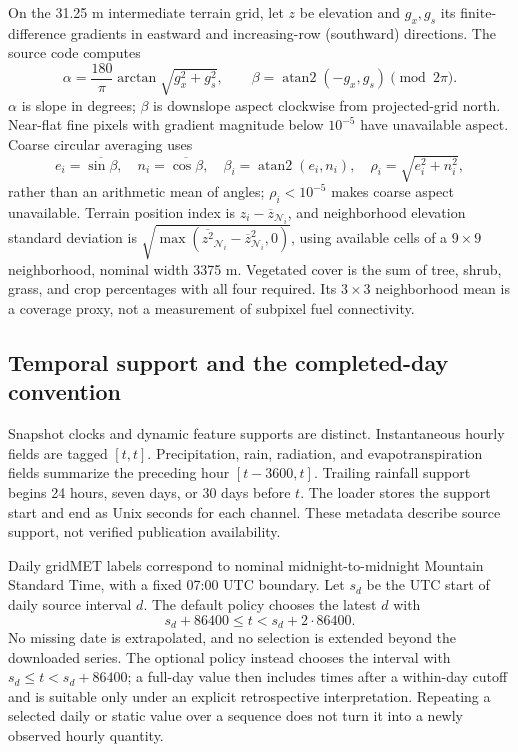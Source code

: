\documentclass[11pt,a4paper]{article}
\begin{document}
On the 31.25 m intermediate terrain grid, let $z$ be elevation and $g_x,g_s$
its finite-difference gradients in eastward and increasing-row (southward)
directions. The source code computes
\begin{equation}
\alpha=\frac{180}{\pi}\arctan\sqrt{g_x^2+g_s^2},\qquad
\beta=\operatorname{atan2}(-g_x,g_s)\pmod{2\pi}.
\end{equation}
$\alpha$ is slope in degrees; $\beta$ is downslope aspect clockwise from
projected-grid north. Near-flat fine pixels with gradient magnitude below
$10^{-5}$ have unavailable aspect. Coarse circular averaging uses
\begin{equation}
e_i=\overline{\sin\beta},\quad n_i=\overline{\cos\beta},\quad
\beta_i=\operatorname{atan2}(e_i,n_i),\quad
\rho_i=\sqrt{e_i^2+n_i^2},
\end{equation}
rather than an arithmetic mean of angles; $\rho_i<10^{-5}$ makes coarse
aspect unavailable. Terrain position index is $z_i-\overline z_{\mathcal N_i}$,
and neighborhood elevation standard deviation is
$\sqrt{\max(\overline{z^2}_{\mathcal N_i}-\overline z_{\mathcal N_i}^2,0)}$,
using available cells of a $9\times9$ neighborhood, nominal width 3375 m.
Vegetated cover is the sum of tree, shrub, grass, and crop percentages with
all four required. Its $3\times3$ neighborhood mean is a coverage proxy, not
a measurement of subpixel fuel connectivity.

\subsection{Temporal support and the completed-day convention}
\label{sec:timesupport}
Snapshot clocks and dynamic feature supports are distinct. Instantaneous
hourly fields are tagged $[t,t]$. Precipitation, rain, radiation, and
evapotranspiration fields summarize the preceding hour $[t-3600,t]$.
Trailing rainfall support begins 24 hours, seven days, or 30 days before $t$.
The loader stores the support start and end as Unix seconds for each channel.
These metadata describe source support, not verified publication availability.

Daily gridMET labels correspond to nominal midnight-to-midnight Mountain
Standard Time, with a fixed 07:00 UTC boundary. Let $s_d$ be the UTC start
of daily source interval $d$. The default  policy chooses
the latest $d$ with
\begin{equation}
s_d+86400\le t<s_d+2\cdot86400.
\end{equation}
No missing date is extrapolated, and no selection is extended beyond the
downloaded series. The optional  policy instead chooses
the interval with $s_d\le t<s_d+86400$; a full-day value then includes times
after a within-day cutoff and is suitable only under an explicit retrospective
interpretation. Repeating a selected daily or static value over a sequence
does not turn it into a newly observed hourly quantity.
\end{document}

